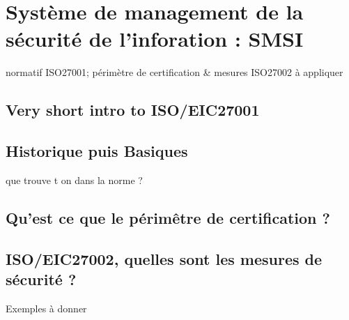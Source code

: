 

\section{Système de management de la sécurité de l'inforation : SMSI}
normatif ISO27001; périmètre de certification \& mesures ISO27002 à appliquer

\subsection{Very short intro to ISO/EIC27001}
\subsection{Historique puis Basiques}
que trouve t on dans la norme ?
\subsection{Qu’est ce que le périmêtre de certification ?}
\subsection{ISO/EIC27002, quelles sont les mesures de sécurité ?}
Exemples à donner

